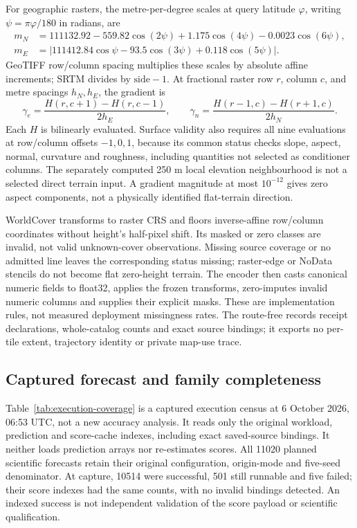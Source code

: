 \documentclass[11pt]{article}
\begin{document}
For geographic rasters, the metre-per-degree scales at query latitude
\(\varphi\), writing \(\psi=\pi\varphi/180\) in radians, are
\begin{align}
 m_N&=111132.92-559.82\cos(2\psi)+1.175\cos(4\psi)
       -0.0023\cos(6\psi),\nonumber\\
 m_E&=\big|111412.84\cos\psi-93.5\cos(3\psi)
       +0.118\cos(5\psi)\big|.
 \label{eq:dem-metric-spacing}
\end{align}
GeoTIFF row/column spacing multiplies these scales by absolute affine
increments; SRTM divides by \(\mathrm{side}-1\). At fractional raster row
\(r\), column \(c\), and metre spacings \(h_N,h_E\), the gradient is
\begin{equation}
 \gamma_e=\frac{H(r,c+1)-H(r,c-1)}{2h_E},\qquad
 \gamma_n=\frac{H(r-1,c)-H(r+1,c)}{2h_N}.
 \label{eq:dem-stencil}
\end{equation}
Each \(H\) is bilinearly evaluated. Surface validity also requires all
nine evaluations at row/column offsets \(-1,0,1\), because its common status
checks slope, aspect, normal, curvature and roughness, including quantities
not selected as conditioner columns. The separately computed 250 m local
elevation neighbourhood is not a selected direct terrain input. A gradient
magnitude at most \(10^{-12}\) gives zero aspect components, not a physically
identified flat-terrain direction.

WorldCover transforms to raster CRS and floors inverse-affine row/column
coordinates without height's half-pixel shift. Its masked or zero classes
are invalid, not valid unknown-cover observations. Missing source coverage
or no admitted line leaves the corresponding status missing; raster-edge or
NoData stencils do not become flat zero-height terrain. The encoder then
casts canonical numeric fields to float32, applies the frozen transforms,
zero-imputes invalid numeric columns and supplies their explicit masks.
These are implementation rules, not measured deployment missingness rates.
The route-free  records
receipt declarations, whole-catalog counts and exact source bindings; it
exports no per-tile extent, trajectory identity or private map-use trace.

\subsection{Captured forecast and family completeness}
\label{sec:execution-coverage}
Table~\ref{tab:execution-coverage} is a captured execution census at
6 October 2026, 06:53 UTC, not a new accuracy analysis. It reads only the
original workload, prediction and score-cache indexes, including exact
saved-source bindings. It neither loads prediction arrays nor re-estimates
scores. All 11020 planned scientific forecasts retain their original
configuration, origin-mode and five-seed denominator. At capture, 10514 were
successful, 501 still runnable and five failed; their score indexes had
the same counts, with no invalid bindings detected. An indexed success is
not independent validation of the score payload or scientific qualification.
\end{document}
